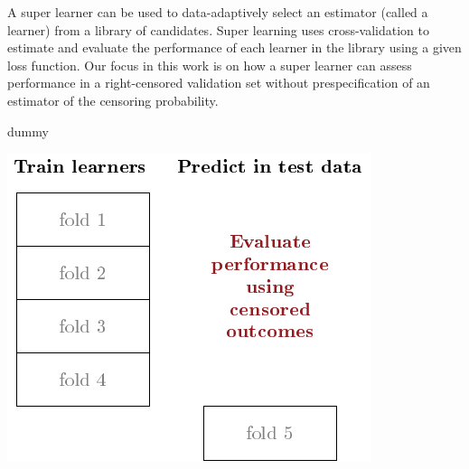 \documentclass[a0,portrait]{a0poster}
\newcommand{\1}{\mathds{1}}
\begin{document}
\begin{minipage}{\textwidth}
\begin{minipage}[t]{1\linewidth}
\begin{multicols}{2}
\begin{multicols}{2}
A super learner can be used to data-adaptively select an estimator (called a
learner) from a library of candidates. Super learning uses cross-validation to
estimate and evaluate the performance of each learner in the library using a
given loss function. Our focus in this work is on how a super learner can assess
performance in a right-censored validation set without prespecification of an
estimator of the censoring probability.

\vfill\null\columnbreak

{\color{white}dummy}

  \begin{center}\vspace{-.5em}
    \includegraphics[width=1\linewidth]{cv-viz.pdf}
  \end{center}
  
\end{multicols}










\end{multicols}
\end{minipage}
\end{minipage}
\end{document}
